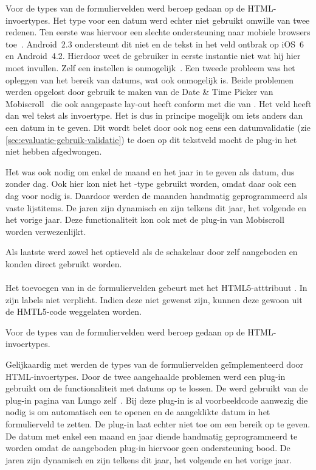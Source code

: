 Voor de types van de formuliervelden werd beroep gedaan op de HTML-invoertypes. 
Het type voor een datum werd echter niet gebruikt omwille van twee redenen.
Ten eerste was hiervoor een slechte ondersteuning naar mobiele browsers toe~\cite{Deveria2013c}.
Android~2.3 ondersteunt dit niet en de  tekst in het veld ontbrak op iOS~6 en Android~4.2.
Hierdoor weet de gebruiker in eerste instantie niet wat hij hier moet invullen. 
Zelf een  instellen is onmogelijk~\cite{Berjon2012}. 
Een tweede probleem was het opleggen van het bereik van datums, wat ook onmogelijk is. 
Beide problemen werden opgelost door gebruik te maken van de Date \& Time Picker van Mobiscroll~\cite{Mobiscroll2013} die ook aangepaste lay-out heeft conform met die van \jqm{}.
Het veld heeft dan wel tekst als invoertype.
Het is dus in principe mogelijk om iets anders dan een datum in te geven. 
Dit wordt belet door ook nog eens een datumvalidatie (zie \ref{sec:evaluatie-gebruik-validatie}) te doen op dit tekstveld mocht de plug-in het niet hebben afgedwongen.
 
Het was ook nodig om enkel de maand en het jaar in te geven als datum, dus zonder dag.
Ook hier kon niet het -type gebruikt worden, omdat daar ook een dag voor nodig is. 
Daardoor werden de maanden handmatig geprogrammeerd als vaste lijstitems. 
De jaren zijn dynamisch en zijn telkens dit jaar, het volgende en het vorige jaar. 
Deze functionaliteit kon ook met de plug-in van Mobiscroll worden verwezenlijkt.

Als laatste werd zowel het optieveld als de schakelaar door \jqm{} zelf aangeboden en konden direct gebruikt worden. 
 
\paragraph{\lungo} 
Het toevoegen van  in de formuliervelden gebeurt met het HTML5-atttribuut .
In \lungo{} zijn labels niet verplicht.
Indien deze niet gewenst zijn, kunnen deze gewoon uit de HMTL5-code weggelaten worden.

Voor de types van de formuliervelden werd beroep gedaan op de HTML-invoertypes. 

Gelijkaardig met \jqm{} werden de types van de formuliervelden geïmplementeerd door HTML-invoertypes. 
Door de twee aangehaalde problemen werd een plug-in gebruikt om de functionaliteit met datums op te lossen.
De  werd gebruikt van de plug-in pagina van Lungo zelf~\cite{TapQuo2013b}.
Bij deze plug-in is al voorbeeldcode aanwezig die nodig is om automatisch een  te openen en de aangeklikte datum in het formulierveld te zetten.
De plug-in laat echter niet toe om een bereik op te geven.
De datum met enkel een maand en jaar diende handmatig geprogrammeerd te worden omdat de aangeboden plug-in hiervoor geen ondersteuning bood.
De jaren zijn dynamisch en zijn telkens dit jaar, het volgende en het vorige jaar. 


